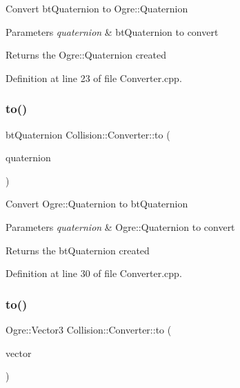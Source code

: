 Convert bt\+Quaternion to Ogre\+::\+Quaternion 
\begin{DoxyParams}{Parameters}
{\em quaternion} & bt\+Quaternion to convert \\
\hline
\end{DoxyParams}
\begin{DoxyReturn}{Returns}
the Ogre\+::\+Quaternion created 
\end{DoxyReturn}


Definition at line 23 of file Converter.\+cpp.

\mbox{\label{class_collision_1_1_converter_a0ed727c0a2fa4df0409cf0f7e98fe7ce}} 
\subsubsection{\texorpdfstring{to()}{to()}\hspace{0.1cm}{\footnotesize\ttfamily [4/6]}}
{\footnotesize\ttfamily bt\+Quaternion Collision\+::\+Converter\+::to (\begin{DoxyParamCaption}\item[{const Ogre\+::\+Quaternion \&}]{quaternion }\end{DoxyParamCaption})\hspace{0.3cm}{\ttfamily [static]}}

Convert Ogre\+::\+Quaternion to bt\+Quaternion 
\begin{DoxyParams}{Parameters}
{\em quaternion} & Ogre\+::\+Quaternion to convert \\
\hline
\end{DoxyParams}
\begin{DoxyReturn}{Returns}
the bt\+Quaternion created 
\end{DoxyReturn}


Definition at line 30 of file Converter.\+cpp.

\mbox{\label{class_collision_1_1_converter_a55c293e2329b62d00c6bd295142b7671}} 
\subsubsection{\texorpdfstring{to()}{to()}\hspace{0.1cm}{\footnotesize\ttfamily [5/6]}}
{\footnotesize\ttfamily Ogre\+::\+Vector3 Collision\+::\+Converter\+::to (\begin{DoxyParamCaption}\item[{const bt\+Vector3 \&}]{vector }\end{DoxyParamCaption})\hspace{0.3cm}{\ttfamily [static]}}

